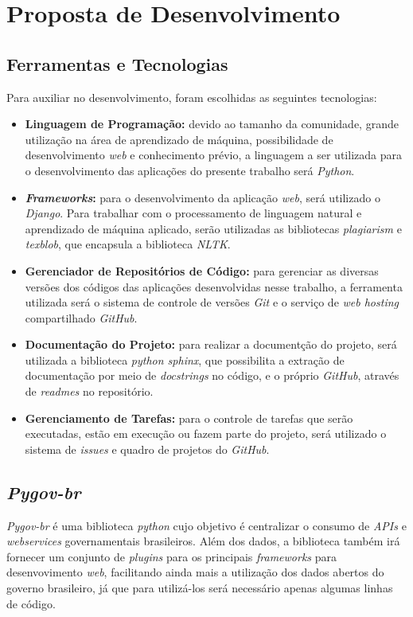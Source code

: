 \section{Proposta de Desenvolvimento}

\subsection{Ferramentas e Tecnologias}

Para auxiliar no desenvolvimento, foram escolhidas as seguintes tecnologias:

\begin{itemize}
    \item \textbf{Linguagem de Programação:} devido ao tamanho da comunidade, grande utilização na área de aprendizado de máquina, possibilidade de desenvolvimento \textit{web} e conhecimento prévio, a linguagem a ser utilizada para o desenvolvimento das aplicações do presente trabalho será \textit{Python}.
    \item \textbf{\textit{Frameworks}:} para o desenvolvimento da aplicação \textit{web}, será utilizado o \textit{Django}. Para trabalhar com o processamento de linguagem natural e aprendizado de máquina aplicado, serão utilizadas as bibliotecas \textit{plagiarism} e \textit{texblob}, que encapsula a biblioteca \textit{NLTK}.
    \item \textbf{Gerenciador de Repositórios de Código:} para gerenciar as diversas versões dos códigos das aplicações desenvolvidas nesse trabalho, a ferramenta utilizada será o sistema de controle de versões \textit{Git} e o serviço de \textit{web hosting} compartilhado \textit{GitHub}.
    \item \textbf{Documentação do Projeto:} para realizar a documentção do projeto, será utilizada a biblioteca \textit{python sphinx}, que possibilita a extração de documentação por meio de \textit{docstrings} no código, e o próprio \textit{GitHub}, através de \textit{readmes} no repositório.
    \item \textbf{Gerenciamento de Tarefas:} para o controle de tarefas que serão executadas, estão em execução ou fazem parte do projeto, será utilizado o sistema de \textit{issues} e quadro de projetos do \textit{GitHub}.
\end{itemize}

\subsection{\textit{Pygov-br}}

\textit{Pygov-br} é uma biblioteca \textit{python} cujo objetivo é centralizar o consumo de \textit{APIs} e \textit{webservices} governamentais brasileiros. Além dos dados, a biblioteca também irá fornecer um conjunto de \textit{plugins} para os principais \textit{frameworks} para desenvovimento \textit{web}, facilitando ainda mais a utilização dos dados abertos do governo brasileiro, já que para utilizá-los será necessário apenas algumas linhas de código.

